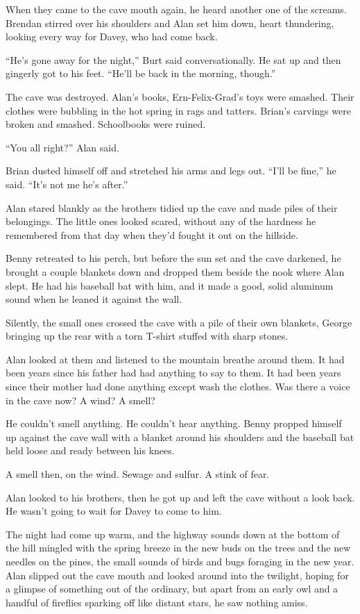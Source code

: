 When they came to the cave mouth again, he heard another one of the
screams.  Brendan stirred over his shoulders and Alan set him down,
heart thundering, looking every way for Davey, who had come back.

``He's gone away for the night,'' Burt said conversationally.  He sat
up and then gingerly got to his feet.  ``He'll be back in the morning,
though.''

The cave was destroyed.  Alan's books, Ern-Felix-Grad's toys were
smashed.  Their clothes were bubbling in the hot spring in rags and
tatters.  Brian's carvings were broken and smashed.  Schoolbooks were
ruined.

``You all right?'' Alan said.

Brian dusted himself off and stretched his arms and legs out.  ``I'll
be fine,'' he said.  ``It's not me he's after.''

Alan stared blankly as the brothers tidied up the cave and made piles
of their belongings.  The little ones looked scared, without any of
the hardness he remembered from that day when they'd fought it out on
the hillside.

Benny retreated to his perch, but before the sun set and the cave
darkened, he brought a couple blankets down and dropped them beside
the nook where Alan slept.  He had his baseball bat with him, and it
made a good, solid aluminum sound when he leaned it against the wall.

Silently, the small ones crossed the cave with a pile of their own
blankets, George bringing up the rear with a torn T-shirt stuffed with
sharp stones.

Alan looked at them and listened to the mountain breathe around them. 
It had been years since his father had had anything to say to them. 
It had been years since their mother had done anything except wash the
clothes.  Was there a voice in the cave now?  A wind?  A smell?

He couldn't smell anything.  He couldn't hear anything.  Benny propped
himself up against the cave wall with a blanket around his shoulders
and the baseball bat held loose and ready between his knees.

A smell then, on the wind.  Sewage and sulfur.  A stink of fear.

Alan looked to his brothers, then he got up and left the cave without
a look back.  He wasn't going to wait for Davey to come to him.

The night had come up warm, and the highway sounds down at the bottom
of the hill mingled with the spring breeze in the new buds on the
trees and the new needles on the pines, the small sounds of birds and
bugs foraging in the new year.  Alan slipped out the cave mouth and
looked around into the twilight, hoping for a glimpse of something out
of the ordinary, but apart from an early owl and a handful of
fireflies sparking off like distant stars, he saw nothing amiss.

